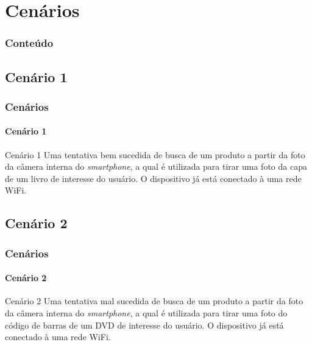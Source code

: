 \documentclass[14pt,beamer]{beamer}
\begin{document}
\section{Cenários}

\begin{frame}
	\frametitle{Conteúdo}
    \begin{multicols}{2}
        \small
    \end{multicols}
\end{frame}

\subsection{Cenário 1}
\begin{frame}
	\frametitle{Cenários}
	\framesubtitle{Cenário 1}

    \begin{block}{Cenário 1}
    Uma tentativa bem sucedida de busca de um produto a partir da foto da câmera
    interna do \emph{smartphone}, a qual é utilizada para tirar uma foto da capa de um livro de
    interesse do usuário. O dispositivo já está conectado à uma rede WiFi.
    \end{block}
\end{frame}

\subsection{Cenário 2}
\begin{frame}
	\frametitle{Cenários}
	\framesubtitle{Cenário 2}

    \begin{block}{Cenário 2}
    Uma tentativa mal sucedida de busca de um produto a partir da
    foto da câmera interna do \emph{smartphone}, a qual é utilizada para
    tirar uma foto do código de barras de um DVD de interesse do usuário.  O dispositivo
    já está conectado à uma rede WiFi.
    \end{block}
\end{frame}
\end{document}
